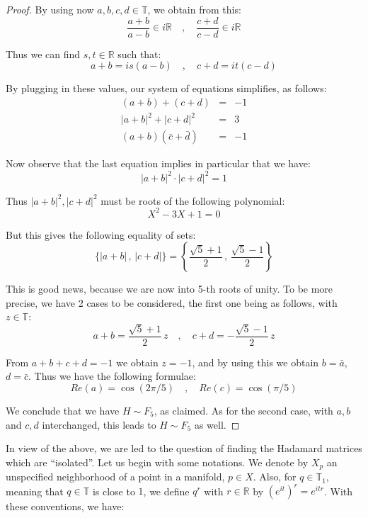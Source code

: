 \documentclass[12pt]{amsbook}
\begin{document}
\begin{proof}
By using now $a,b,c,d\in\mathbb T$, we obtain from this:
$$\frac{a+b}{a-b}\in i\mathbb R\quad,\quad 
\frac{c+d}{c-d}\in i\mathbb R$$

Thus we can find $s,t\in\mathbb R$ such that:
$$a+b=is(a-b)\quad,\quad 
c+d=it(c-d)$$

By plugging in these values, our system of equations simplifies, as follows:
\begin{eqnarray*}
(a+b)+(c+d)&=&-1\\
|a+b|^2+|c+d|^2&=&3\\
(a+b)(\bar{c}+\bar{d})&=&-1
\end{eqnarray*}

Now observe that the last equation implies in particular that we have:
$$|a+b|^2\cdot|c+d|^2=1$$

Thus $|a+b|^2,|c+d|^2$ must be roots of the following polynomial:
$$X^2-3X+1=0$$

But this gives the following equality of sets:
$$\Big\{|a+b|\,,\,|c+d|\Big\}=\left\{\frac{\sqrt{5}+1}{2}\,,\,\frac{\sqrt{5}-1}{2}\right\}$$

This is good news, because we are now into 5-th roots of unity. To be more precise, we have 2 cases to be considered, the first one being as follows, with $z\in\mathbb T$:
$$a+b=\frac{\sqrt{5}+1}{2}\,z\quad,\quad 
c+d=-\frac{\sqrt{5}-1}{2}\,z$$

From $a+b+c+d=-1$ we obtain $z=-1$, and by using this we obtain $b=\bar{a}$, $d=\bar{c}$. Thus we have the following formulae:
$$Re(a)=\cos(2\pi/5)\quad,\quad 
Re(c)=\cos(\pi/5)$$

We conclude that we have $H\sim F_5$, as claimed. As for the second case, with $a,b$ and $c,d$ interchanged, this leads to $H\sim F_5$ as well.
\end{proof}

In view of the above, we are led to the question of finding the Hadamard matrices which are ``isolated''. Let us begin with some notations. We denote by $X_p$ an unspecified neighborhood of a point in a manifold, $p\in X$. Also, for $q\in\mathbb T_1$, meaning that $q\in\mathbb T$ is close to $1$, we define $q^r$ with $r\in\mathbb R$ by $(e^{it})^r=e^{itr}$. With these conventions, we have:
\end{document}

